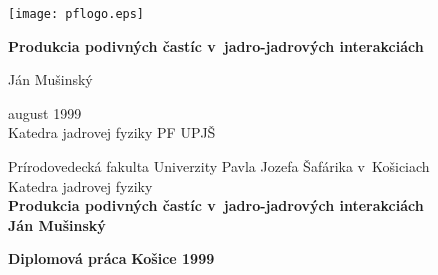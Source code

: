 \begin{titlepage}
\begin{center}
\texttt{[image: pflogo.eps]}
\end{center}
\vspace*{2.5cm}
\begin{center}
{\Large{\bf Produkcia podivných častíc v~jadro-jadrových
interakciách}} 
\end{center}
\vspace*{2cm}
\begin{center}
{\Large Ján Mušinský}
\end{center}
\vspace*{5cm}
\begin{center}
  august 1999 \\
 Katedra jadrovej fyziky PF UPJŠ
\end{center}

\end{titlepage}
\begin{titlepage}
\vspace*{2cm} \begin{center}
{\LARGE Prírodovedecká fakulta Univerzity Pavla
Jozefa Šafárika v~Košiciach \\ \vspace{3ex} Katedra jadrovej fyziky}
\\ \vspace{3cm} {\Huge{\bf Produkcia podivných častíc
v~jadro-jadrových interakciách}} \\ \vspace{1cm}
{\large{\bf Ján Mušinský}} \end{center}
\vspace{6cm} {\bf Diplomová práca} \hfill {\bf Košice 1999}
\end{titlepage}
